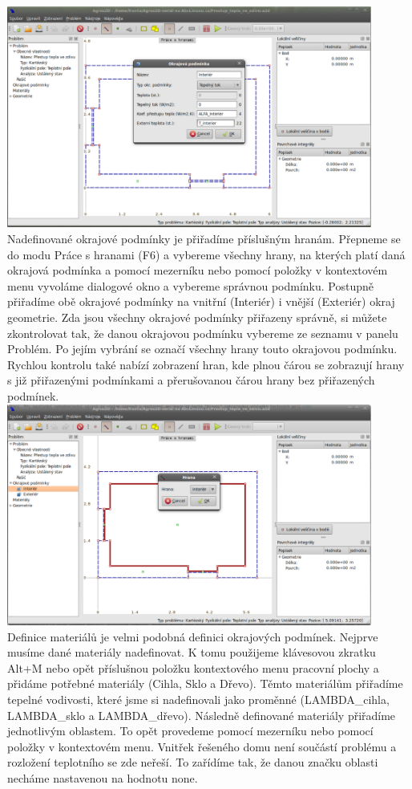 \documentclass[a4paper, oneside]{article}
\begin{document}
\includegraphics[width=12cm]{Definice_okrajove_podminky.eps}\\
Nadefinované okrajové podmínky je přiřadíme příslušným hranám. Přepneme se do modu Práce s hranami (F6) a vybereme všechny hrany, na kterých platí daná okrajová podmínka a pomocí mezerníku nebo pomocí položky v kontextovém menu vyvoláme dialogové okno a vybereme správnou podmínku. Postupně přiřadíme obě okrajové podmínky na vnitřní (Interiér) i vnější (Exteriér) okraj geometrie. Zda jsou všechny okrajové podmínky přiřazeny správně, si můžete zkontrolovat tak, že danou okrajovou podmínku vybereme ze seznamu v panelu Problém. Po jejím vybrání se označí všechny hrany touto okrajovou podmínku. Rychlou kontrolu také nabízí zobrazení hran, kde plnou čárou se zobrazují hrany s již přiřazenými podmínkami a přerušovanou čárou hrany bez přiřazených podmínek.\\
\includegraphics[width=12cm]{Prirazeni_okrajove_podminky.eps}\\
Definice materiálů je velmi podobná definici okrajových podmínek. Nejprve musíme dané materiály nadefinovat. K tomu použijeme klávesovou zkratku Alt+M nebo opět příslušnou položku kontextového menu pracovní plochy a přidáme potřebné materiály (Cihla, Sklo a Dřevo). Těmto materiálům přiřadíme tepelné vodivosti, které jsme si nadefinovali jako proměnné (LAMBDA\_cihla, LAMBDA\_sklo a LAMBDA\_dřevo). Následně definované materiály přiřadíme jednotlivým oblastem. To opět provedeme pomocí mezerníku nebo pomocí položky v kontextovém menu. Vnitřek řešeného domu není součástí problému a rozložení teplotního se zde neřeší. To zařídíme tak, že danou značku oblasti necháme nastavenou na hodnotu none.\\
\end{document}
